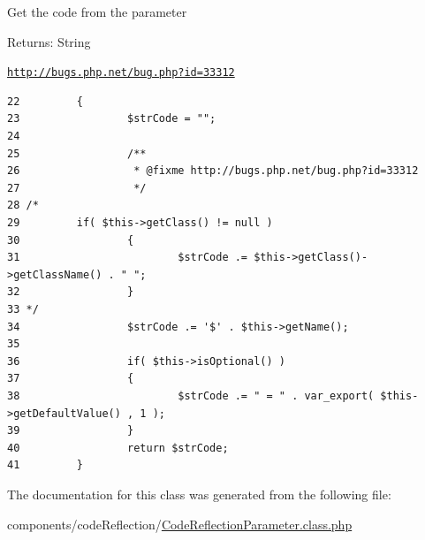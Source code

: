 Get the code from the parameter

\begin{Desc}
\item[Returns:]String \end{Desc}


\href{http://bugs.php.net/bug.php?id=33312}{\tt http://bugs.php.net/bug.php?id=33312}

\begin{Code}\begin{verbatim}22         {
23                 $strCode = "";
24                 
25                 /**
26                  * @fixme http://bugs.php.net/bug.php?id=33312
27                  */
28 /*
29         if( $this->getClass() != null )
30                 {
31                         $strCode .= $this->getClass()->getClassName() . " ";
32                 }
33 */
34                 $strCode .= '$' . $this->getName();
35 
36                 if( $this->isOptional() )
37                 {
38                         $strCode .= " = " . var_export( $this->getDefaultValue() , 1 );
39                 }
40                 return $strCode;
41         }
\end{verbatim}
\end{Code}




The documentation for this class was generated from the following file:\begin{CompactItemize}
\item 
components/codeReflection/\hyperlink{_code_reflection_parameter_8class_8php}{CodeReflectionParameter.class.php}\end{CompactItemize}
